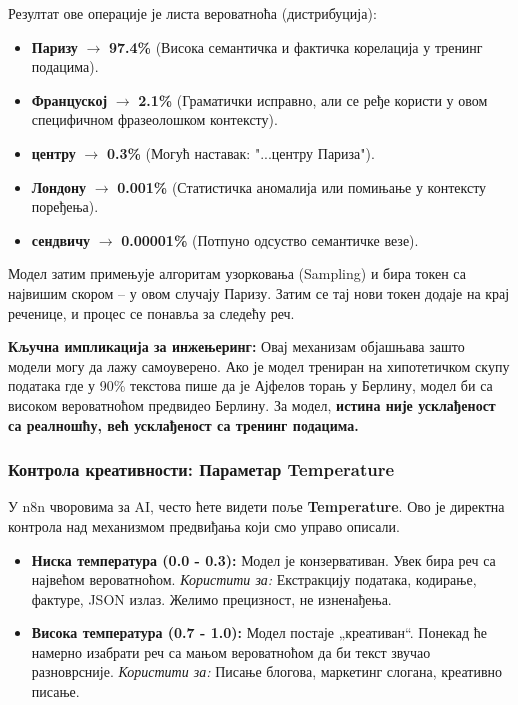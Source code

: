 Резултат ове операције је листа вероватноћа (дистрибуција):

\begin{itemize}
    \item \textbf{Паризу} $\rightarrow$ \textbf{97.4\%} (Висока семантичка и фактичка корелација у тренинг подацима).
    \item \textbf{Француској} $\rightarrow$ \textbf{2.1\%} (Граматички исправно, али се ређе користи у овом специфичном фразеолошком контексту).
    \item \textbf{центру} $\rightarrow$ \textbf{0.3\%} (Могућ наставак: "...центру Париза").
    \item \textbf{Лондону} $\rightarrow$ \textbf{0.001\%} (Статистичка аномалија или помињање у контексту поређења).
    \item \textbf{сендвичу} $\rightarrow$ \textbf{0.00001\%} (Потпуно одсуство семантичке везе).
\end{itemize}

Модел затим примењује алгоритам узорковања (Sampling) и бира токен са највишим скором – у овом случају Паризу.
Затим се тај нови токен додаје на крај реченице, и процес се понавља за следећу реч.

\textbf{Кључна импликација за инжењеринг:}
Овај механизам објашњава зашто модели могу да лажу самоуверено. Ако је модел трениран на хипотетичком скупу података где у 90\% текстова пише да је Ајфелов торањ у Берлину, модел би са високом вероватноћом предвидео Берлину. За модел, \textbf{истина није усклађеност са реалношћу, већ усклађеност са тренинг подацима.}
\subsubsection{Контрола креативности: Параметар Temperature}

У n8n чворовима за AI, често ћете видети поље \textbf{Temperature}. Ово је директна контрола над механизмом предвиђања који смо управо описали.

\begin{tcolorbox}[colback=blue!5!white,colframe=blue!75!black,title=Подешавање параметра Temperature]
\begin{itemize}
    \item \textbf{Ниска температура (0.0 - 0.3):} Модел је конзервативан. Увек бира реч са највећом вероватноћом.
    \textit{Користити за:} Екстракцију података, кодирање, фактуре, JSON излаз. Желимо прецизност, не изненађења.
    
    \item \textbf{Висока температура (0.7 - 1.0):} Модел постаје „креативан“. Понекад ће намерно изабрати реч са мањом вероватноћом да би текст звучао разноврсније.
    \textit{Користити за:} Писање блогова, маркетинг слогана, креативно писање.
\end{itemize}
\end{tcolorbox}

